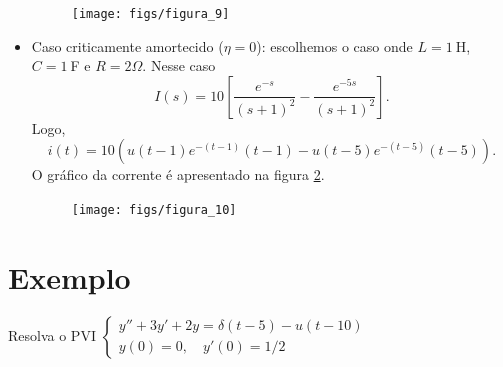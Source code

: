 \documentclass[a4paper,10pt]{book}
\begin{document}
\begin{itemize}
\begin{figure}[!ht]
\begin{center}
 \texttt{[image: figs/figura\_9]}\end{center}
 \caption{\label{fig_circ_RCL_2}}
 \end{figure}
 \item Caso criticamente amortecido ($\eta=0$): escolhemos o caso onde $L=1\ \!$H, $C=1\ \!$F e $R=2\Omega$. Nesse caso
  \begin{equation}
  I(s)=10\left[\frac{e^{-s}}{\left(s+1\right)^2}-\frac{e^{-5s}}{\left(s+1\right)^2}\right].
  \end{equation}
  Logo,
  \begin{equation}
  i(t)=10\left(u(t-1)e^{-(t-1)} (t-1)-u(t-5)e^{-(t-5)} (t-5)\right).
  \end{equation}
O gráfico da corrente é apresentado na figura \ref{fig_circ_RCL_3}.
 \begin{figure}[!ht]
 \begin{center}
 \texttt{[image: figs/figura\_10]}\end{center}
 \caption{\label{fig_circ_RCL_3}}
 \end{figure}
 \end{itemize}
% 
% 
 \section{Exemplo}
 Resolva o PVI $\displaystyle \left\{
                               \begin{array}{ll}
                                 y'' + 3y'+2y = \delta(t-5) - u(t-10)\\
                                 y(0) = 0, \quad y'(0)=1/2
                                 \end{array}
                             \right.$
 
\end{document}
